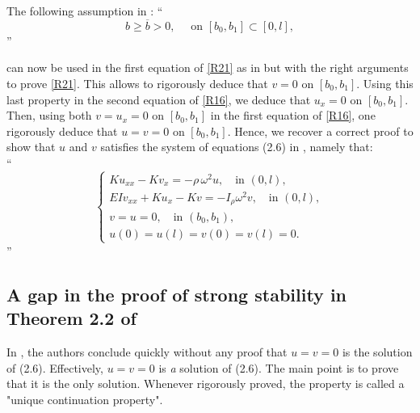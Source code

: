 \documentclass[10pt, english]{article}
\begin{document}
{The following assumption in \cite{SW2003}:
\enquote{
\begin{equation}\label{R22}%
b \geqslant \overline{b} >0, \quad \mbox{ on } [b_0, b_1] \subset [0, l],
\end{equation}
}

\noindent can now be used in the first equation of \eqref{R21} as in \cite{SW2003} but with the right arguments to prove \eqref{R21}. This allows to rigorously deduce that $v=0$ on $[b_0, b_1]$. Using this last property in the second equation of \eqref{R16}, we deduce that $u_x=0$ on $[b_0, b_1]$. Then, using both $v=u_x=0$ on $[b_0, b_1]$ in the first equation of \eqref{R16}, one rigorously deduce that $u=v=0$ on $[b_0, b_1]$.
Hence, we recover a correct proof to show that $u$ and $v$ satisfies the system of equations (2.6) in \cite{SW2003}, namely that:
\ \\
\enquote{
\begin{equation*}\label{R23}\tag{$2.6$}
\begin{cases}
Ku_{xx} -Kv_x=-\rho\, \omega^2 u, \quad \mbox{in } (0,l),\\
EIv_{xx} +Ku_x -Kv=-I_{\rho} \omega^2 v, \quad \mbox{in } (0,l),\\
v=u=0, \quad \mbox{in } (b_0,b_1),\\
u(0)=u(l)=v(0)=v(l)=0.
\end{cases}
\end{equation*}
}
\subsection{A gap in the proof of strong stability in Theorem 2.2 of \cite{SW2003}}
In \cite{SW2003}, the authors conclude quickly without any proof that $u=v=0$ is the solution of (2.6). Effectively, $u=v=0$ is {\it a} solution of (2.6). The main point is to prove that it is the only solution. Whenever rigorously proved, the property is called a "unique continuation property". 
}
\end{document}

